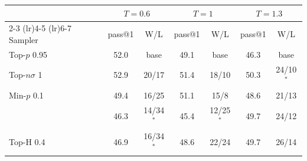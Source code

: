\begin{tabular}{lcccccc}
\toprule
 & \multicolumn{2}{c}{$T{=}0.6$} & \multicolumn{2}{c}{$T{=}1$} & \multicolumn{2}{c}{$T{=}1.3$} \\
\cmidrule(lr){2-3} \cmidrule(lr){4-5} \cmidrule(lr){6-7}
Sampler & pass@1 & W/L & pass@1 & W/L & pass@1 & W/L \\
\midrule
Top-$p$ 0.95 & 52.0 & base & 49.1 & base & 46.3 & base \\
Top-$n\sigma$ 1 & 52.9 & 20/17 & 51.4 & 18/10 & 50.3 & 24/10$^{*}$ \\
Min-$p$ 0.1 & 49.4 & 16/25 & 51.1 & 15/8 & 48.6 & 21/13 \\
\pless{} & 46.3 & 14/34$^{*}$ & 45.4 & 12/25$^{*}$ & 49.7 & 24/12 \\
Top-H 0.4 & 46.9 & 16/34$^{*}$ & 48.6 & 22/24 & 49.7 & 26/14 \\
\bottomrule
\end{tabular}
